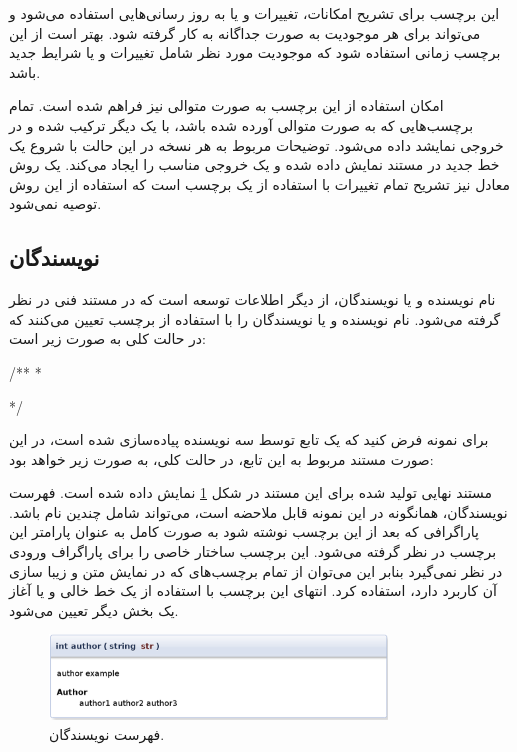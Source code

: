 \begin{note}
این برچسب برای تشریح امکانات، تغییرات و یا به روز رسانی‌هایی استفاده می‌شود و
می‌تواند برای هر موجودیت به صورت جداگانه به کار گرفته شود.
بهتر است از این برچسب زمانی استفاده شود که موجودیت مورد نظر شامل تغییرات و یا
شرایط جدید باشد.
\end{note}

امکان استفاده از این برچسب به صورت متوالی نیز فراهم شده است.
تمام برچسب‌هایی که به صورت متوالی آورده شده باشد، با یک دیگر ترکیب شده و در
خروجی نمایشد داده می‌شود.
توضیحات مربوط به هر نسخه در این حالت با شروع یک خط جدید در مستند نمایش داده شده
و یک خروجی مناسب را ایجاد می‌کند.
یک روش معادل نیز تشریح تمام تغییرات با استفاده از یک برچسب است که استفاده از این
روش توصیه نمی‌شود.


\subsection{نویسندگان}

نام نویسنده و یا نویسندگان، از دیگر اطلاعات توسعه است که در مستند فنی در نظر
گرفته می‌شود.
نام نویسنده و یا نویسندگان را با استفاده از برچسب  تعیین می‌کنند که
در حالت کلی به صورت زیر است:
\begin{C++}
/**
 * \author {list of autohrs}
 */
\end{C++}

برای نمونه فرض کنید که یک تابع توسط سه نویسنده پیاده‌سازی شده است، در این صورت
مستند مربوط به این تابع، در حالت کلی، به صورت زیر خواهد بود:

مستند نهایی تولید شده برای این مستند در شکل
\ref{write/document-the-code/developer-info/author-multi} نمایش داده شده است.
فهرست نویسندگان، همانگونه در این نمونه قابل ملاحضه است، می‌تواند شامل چندین نام
باشد.
پاراگرافی که بعد از این برچسب نوشته شود به صورت کامل به عنوان پارامتر این برچسب
در نظر گرفته می‌شود.
این برچسب ساختار خاصی را برای پاراگراف ورودی در نظر نمی‌گیرد بنابر این می‌توان
از تمام برچسب‌های که در نمایش متن و زیبا سازی آن کاربرد دارد، استفاده کرد.
انتهای این برچسب با استفاده از یک خط خالی و یا آغاز یک بخش دیگر تعیین می‌شود.
\begin{figure}
	\centering
	\includegraphics[width=0.8\textwidth]{image/write/document-the-code/developer-info/author-multi}
	\caption[فهرست نویسندگان]{
		فهرست نویسندگان.
	}
	\label{write/document-the-code/developer-info/author-multi}
\end{figure}



